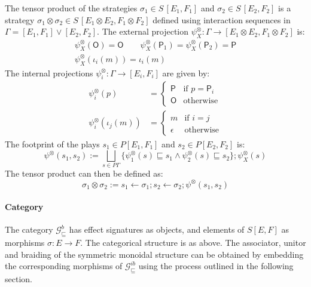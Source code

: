 \documentclass[sigplan,screen]{acmart}
\newcommand{\gcat}{\mathcal{G}_{\sqsubseteq}}
\newcommand{\kw}[1]{\ensuremath{ \mathsf{#1} }}
\begin{document}
The tensor product of the strategies
$\sigma_1 \in S\,[E_1,F_1]$ and 
$\sigma_2 \in S\,[E_2,F_2]$
is a strategy
$\sigma_1 \otimes \sigma_2 \in S\,[E_1 \otimes E_2, F_1 \otimes F_2]$
defined using interaction sequences in
$\Gamma = [E_1,F_1] \vee [E_2,F_2]$.
The external projection
$\psi^\otimes_X : \Gamma \rightarrow [E_1 \otimes E_2, F_1 \otimes F_2]$
is:
\begin{gather*}
  \psi^\otimes_X(\kw{O}) = \kw{O} \qquad
  \psi^\otimes_X(\kw{P}_1) = \psi^\otimes_X(\kw{P}_2) = \kw{P} \\
  \psi^\otimes_X(\iota_i(m)) = \iota_i(m)
\end{gather*}
The internal projections
$\psi^\otimes_i : \Gamma \rightarrow [E_i, F_i]$
are given by:
\begin{align*}
  \psi^\otimes_i(p) &= \begin{cases}
    \kw{P} & \text{if } p = \kw{P}_i \\
    \kw{O} & \text{otherwise}
  \end{cases} \\
  \psi^\otimes_i(\iota_j(m)) &= \begin{cases}
    m & \text{if } i = j \\
    \epsilon & \text{otherwise}
  \end{cases}
\end{align*}
The footprint of the plays
$s_1 \in P [E_1,F_1]$ and $s_2 \in P [E_2, F_2]$
is:
\[
  \psi^\otimes(s_1, s_2) :=
  \bigsqcup_{s \in P \Gamma}
  \{ \psi^\otimes_1(s) \sqsubseteq s_1 \wedge
     \psi^\otimes_2(s) \sqsubseteq s_2 \} ;
  \psi^\otimes_X(s)
\]
The tensor product can then be defined as:
\[
  \sigma_1 \otimes \sigma_2 :=
  s_1 \leftarrow \sigma_1 ;
  s_2 \leftarrow \sigma_2 ;
  \psi^\otimes(s_1, s_2)
\]


\paragraph{Category} %

The category $\gcat^b$
has effect signatures as objects,
and elements of $S [E,F]$
as morphisms $\sigma : E \rightarrow F$.
The categorical structure is as above.
The associator, unitor and braiding of
the symmetric monoidal structure
can be obtained by embedding
the corresponding morphisms of $\gcat^{ib}$
using the process outlined in the following section.


\end{document}
